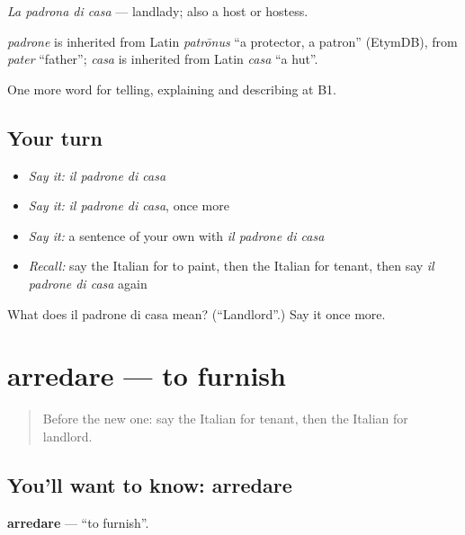 \emph{La padrona di casa} — landlady; also a host or hostess.

\begin{cousinweb}
\emph{padrone} is inherited from Latin \emph{patrōnus} \textquotedblleft{}a protector, a patron\textquotedblright{} (EtymDB), from \emph{pater} \textquotedblleft{}father\textquotedblright{}; \emph{casa} is inherited from Latin \emph{casa} \textquotedblleft{}a hut\textquotedblright{}.
\end{cousinweb}

\begin{grammarlens}[title={What you've built}]
One more word for telling, explaining and describing at B1.
\end{grammarlens}

\subsection*{Your turn}
\begin{itemize}
\raggedright
  \item \emph{Say it:} \emph{il padrone di casa}
  \item \emph{Say it:} \emph{il padrone di casa}, once more
  \item \emph{Say it:} a sentence of your own with \emph{il padrone di casa}
  \item \emph{Recall:} say the Italian for to paint, then the Italian for tenant, then say \emph{il padrone di casa} again
\end{itemize}

\begin{tcolorbox}[breakable,colback=teal!4,colframe=teal!35!black,title={Before you move on}]
What does il padrone di casa mean? (\textquotedblleft{}Landlord\textquotedblright{}.) Say it once more.
\end{tcolorbox}
\section[arredare]{arredare — to furnish}

\label{lesson:IT-C536-arredare}



\begin{quote}
Before the new one: say the Italian for tenant, then the Italian for landlord.
\end{quote}

\subsection*{You'll want to know: arredare}
\textbf{arredare} — \textquotedblleft{}to furnish\textquotedblright{}.

